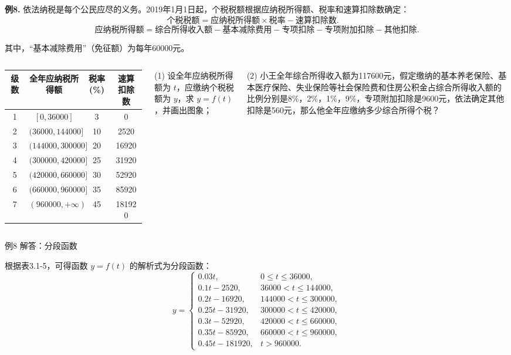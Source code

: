 \documentclass[10pt,aspectratio=169,serif]{beamer}
\begin{document}
\begin{frame}[t]%
\vspace{-0.5em}
\textbf{例8.} 依法纳税是每个公民应尽的义务。2019年1月1日起，个税税额根据应纳税所得额、税率和速算扣除数确定：
\[
\text{个税税额} = \text{应纳税所得额} \times \text{税率} - \text{速算扣除数}. \quad \tag{1}
\]
\[
\text{应纳税所得额} = \text{综合所得收入额} - \text{基本减除费用} - \text{专项扣除} - \text{专项附加扣除} - \text{其他扣除}. \tag{2}
\]

其中，“基本减除费用”（免征额）为每年60000元。

\vspace{0.5em}
\begin{columns}
\small

\begin{tabular}{c|c|c|c}
\toprule
级数 & 全年应纳税所得额 & 税率(\%) & 速算扣除数 \\
\midrule
1 & $[0,36000]$ & 3 & 0 \\
2 & $(36000,144000]$ & 10 & 2520 \\
3 & $(144000,300000]$ & 20 & 16920 \\
4 & $(300000,420000]$ & 25 & 31920 \\
5 & $(420000,660000]$ & 30 & 52920 \\
6 & $(660000,960000]$ & 35 & 85920 \\
7 & $(960000,+\infty)$ & 45 & 181920 \\
\bottomrule
\end{tabular}

\small
(1) 设全年应纳税所得额为 $t$，应缴纳个税税额为 $y$，求 $y=f(t)$，并画出图象；

\addvspace{1ex}
(2) 小王全年综合所得收入额为117600元，假定缴纳的基本养老保险、基本医疗保险、失业保险等社会保险费和住房公积金占综合所得收入额的比例分别是8\%，2\%，1\%，9\%，专项附加扣除是9600元，依法确定其他扣除是560元，那么他全年应缴纳多少综合所得个税？
\end{columns}
\end{frame}

\begin{frame}[t]{例8 解答：分段函数}
\begin{tcolorbox}[colback=orange!10,colframe=orange,title=\textbf{解：(1)}]
根据表3.1-5，可得函数 $y=f(t)$ 的解析式为分段函数：
\[
y=
\begin{cases}
0.03t, & 0 \le t \le 36000, \\
0.1t - 2520, & 36000 < t \le 144000, \\
0.2t - 16920, & 144000 < t \le 300000, \\
0.25t - 31920, & 300000 < t \le 420000, \\
0.3t - 52920, & 420000 < t \le 660000, \\
0.35t - 85920, & 660000 < t \le 960000, \\
0.45t - 181920, & t > 960000.
\end{cases}\tag{3}
\]
\end{tcolorbox}
\end{frame}
\end{document}
